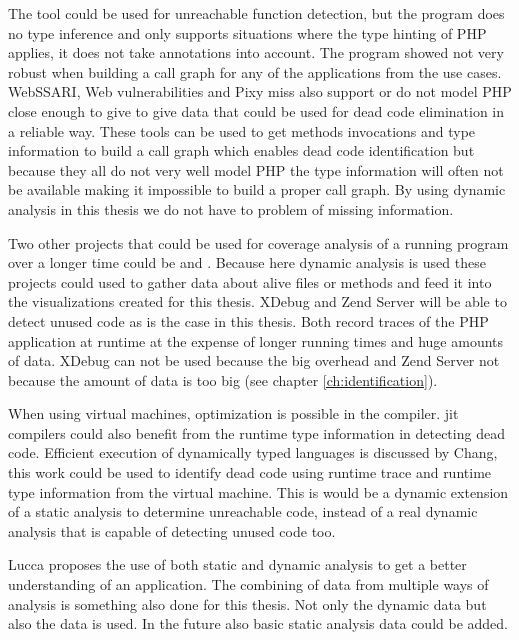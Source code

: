 The tool  could be used for unreachable function detection, but the program does no type inference and only supports situations where the type hinting of PHP applies, it does not take annotations into account. The program showed not very robust when building a call graph for any of the applications from the use cases. WebSSARI\cite{huang2004}, Web vulnerabilities\cite{xie2006} and Pixy\cite{jovanovic2006} miss also support or do not model PHP close enough to give to  give data that could be used for dead code elimination in a reliable way\cite{biggar2009}. These tools can be used to get methods invocations and type information to build a call graph which enables dead code identification but because they all do not very well model PHP the type information will often not be available making it impossible to build a proper call graph. By using dynamic analysis in this thesis we do not have to problem of missing information.

Two other projects that could be used for coverage analysis of a running program over a longer time could be  and . Because here dynamic analysis is used these projects could used to gather data about alive files or methods and feed it into the visualizations created for this thesis. XDebug and Zend Server will be able to detect unused code as is the case in this thesis. Both record traces of the PHP application at runtime at the expense of longer running times and huge amounts of data. XDebug can not be used because the big overhead and Zend Server not because the amount of data is too big (see chapter \ref{ch:identification}). 

When using virtual machines, optimization is possible in the \jit compiler. \Gls{jit} compilers could also benefit from the runtime type information in detecting dead code. Efficient \jit execution of dynamically typed languages is discussed by Chang\cite{chang2007}, this work could be used to identify dead code using runtime trace and runtime type information from the virtual machine. This is would be a dynamic extension of a static analysis to determine unreachable code, instead of a real dynamic analysis that is capable of detecting unused code too.

Lucca\cite{lucca2005} proposes the use of both static and dynamic analysis to get a better understanding of an application. The combining of data from multiple ways of analysis is something also done for this thesis. Not only the dynamic data but also the \vcs data is used. In the future also basic static analysis data could be added.


